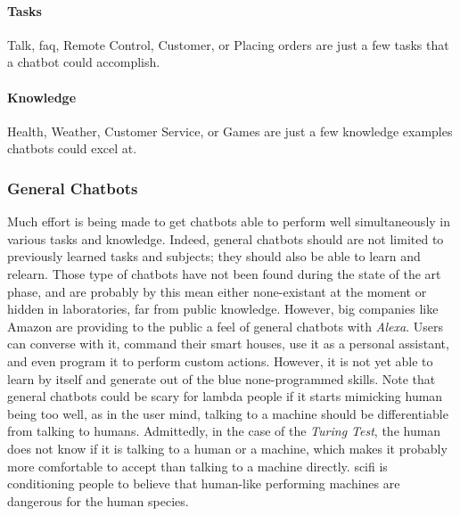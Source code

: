 \paragraph{Tasks}
Talk, \gls{faq}, Remote Control, Customer, or Placing orders are just a few tasks that a chatbot could accomplish.

\paragraph{Knowledge}
Health, Weather, Customer Service, or Games are just a few knowledge examples chatbots could excel at.

\subsubsection{General Chatbots}
Much effort is being made to get chatbots able to perform well simultaneously in various tasks and knowledge. Indeed, general chatbots should are not limited to previously learned tasks and subjects; they should also be able to learn and relearn. 
Those type of chatbots have not been found during the state of the art phase, and are probably by this mean either none-existant at the moment or hidden in laboratories, far from public knowledge. 
However, big companies like Amazon are providing to the public a feel of general chatbots with \textit{Alexa}\cite{chatbot:alexa}. Users can converse with it, command their smart houses, use it as a personal assistant, and even program it to perform custom actions. However, it is not yet able to learn by itself and generate out of the blue none-programmed skills.
Note that general chatbots could be scary for lambda people if it starts mimicking human being too well, as in the user mind, talking to a machine should be differentiable from talking to humans. Admittedly, in the case of the \textit{Turing Test}\cite{paper:turing}, the human does not know if it is talking to a human or a machine, which makes it probably more comfortable to accept than talking to a machine directly. \gls{scifi} is conditioning people to believe that human-like performing machines are dangerous for the human species.

